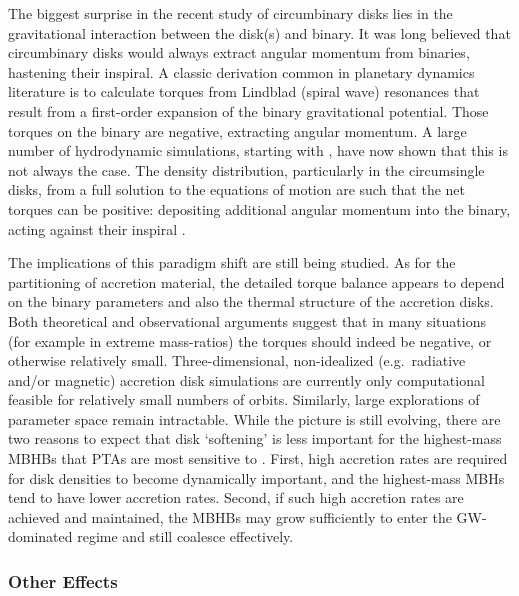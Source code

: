 \documentclass[onecolumn,authoryear]{els-mrw}
\begin{document}
The biggest surprise in the recent study of circumbinary disks lies in the gravitational interaction between the disk(s) and binary.  It was long believed that circumbinary disks would always extract angular momentum from binaries, hastening their inspiral.  A classic derivation common in planetary dynamics literature is to calculate torques from Lindblad (spiral wave) resonances that result from a first-order expansion of the binary gravitational potential.  Those torques on the binary are negative, extracting angular momentum.  A large number of hydrodynamic simulations, starting with \citet{Miranda+2017}, have now shown that this is not always the case.  The density distribution, particularly in the circumsingle disks, from a full solution to the equations of motion are such that the net torques can be positive: depositing additional angular momentum into the binary, acting against their inspiral \citep{Muñoz+2019}.

The implications of this paradigm shift are still being studied.  As for the partitioning of accretion material, the detailed torque balance appears to depend on the binary parameters and also the thermal structure of the accretion disks.  Both theoretical and observational arguments suggest that in many situations (for example in extreme mass-ratios) the torques should indeed be negative, or otherwise relatively small.  Three-dimensional, non-idealized (e.g.~radiative and/or magnetic) accretion disk simulations are currently only computational feasible for relatively small numbers of orbits.  Similarly, large explorations of parameter space remain intractable.  While the picture is still evolving, there are two reasons to expect that disk `softening' is less important for the highest-mass MBHBs that PTAs are most sensitive to \citep{Bortolas+2021}.  First, high accretion rates are required for disk densities to become dynamically important, and the highest-mass MBHs tend to have lower accretion rates.  Second, if such high accretion rates are achieved and maintained, the MBHBs may grow sufficiently to enter the GW-dominated regime and still coalesce effectively.

\subsubsection{Other Effects}\label{sec:binary_evolution_other}
\end{document}

